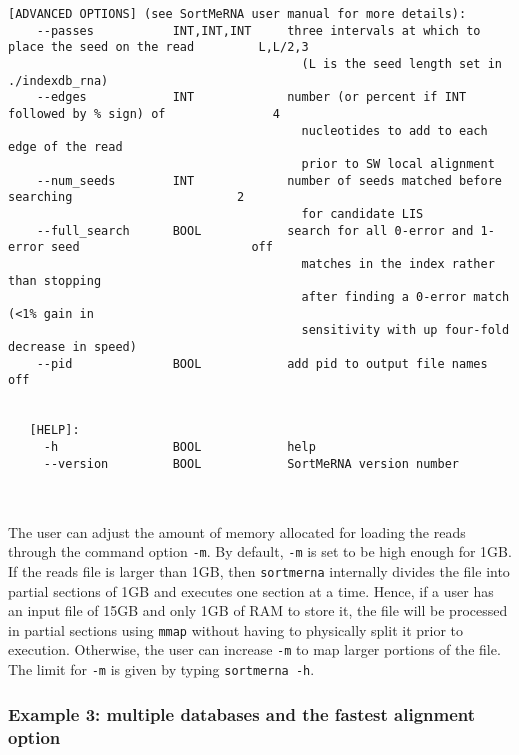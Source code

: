 \documentclass[10pt,a4paper]{article}
\begin{document}
\begin{Verbatim}[fontsize=\footnotesize]
   [ADVANCED OPTIONS] (see SortMeRNA user manual for more details): 
    --passes           INT,INT,INT     three intervals at which to place the seed on the read         L,L/2,3
                                         (L is the seed length set in ./indexdb_rna)
    --edges            INT             number (or percent if INT followed by % sign) of               4
                                         nucleotides to add to each edge of the read
                                         prior to SW local alignment 
    --num_seeds        INT             number of seeds matched before searching                       2
                                         for candidate LIS 
    --full_search      BOOL            search for all 0-error and 1-error seed                        off
                                         matches in the index rather than stopping
                                         after finding a 0-error match (<1% gain in
                                         sensitivity with up four-fold decrease in speed)
    --pid              BOOL            add pid to output file names                                   off


   [HELP]:
     -h                BOOL            help
     --version         BOOL            SortMeRNA version number


\end{Verbatim}

~\\
\noindent The user can adjust the amount of memory allocated for loading the reads through the 
command option \texttt{-m}. By default, \texttt{-m} is set to be high enough for 1GB.
If the reads file is larger than 1GB, then \texttt{sortmerna} internally divides the file into partial sections of 
1GB and executes one section at a time. Hence, if a user has an input file of 15GB and only 1GB of RAM to store it, the 
file will be processed in partial sections using \texttt{mmap} without having to physically split it prior to execution. Otherwise, the user
can increase \texttt{-m} to map larger portions of the file. The limit for \texttt{-m} is given by typing \texttt{sortmerna -h}.


\newpage
 
\subsubsection{Example 3: multiple databases and the fastest alignment option}
\end{document}
